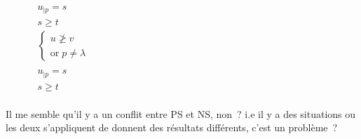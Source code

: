 \begin{figure}
\begin{center}
    \doubleLine{}
    \DP{} \\[12pt]

    \doubleLine{}
    \DP{}
    $\begin{matrix}
      u_{|p} = s \\
      s \geq t \\
      \left\{ \begin{matrix} u \not\geq v \\ \text{or}\; p \neq \lambda\end{matrix}\right. \\
    \end{matrix}$ \\[12pt]

    \doubleLine{}
    \DP{}
    $\begin{matrix}
      u_{|p} = s \\
      s \geq t \\
    \end{matrix}$ 

  \end{center}
\end{figure}

Il me semble qu'il y a un conflit entre PS et NS, non~? i.e il y a des situations ou les
deux s'appliquent de donnent des résultats différents, c'est un problème~?

